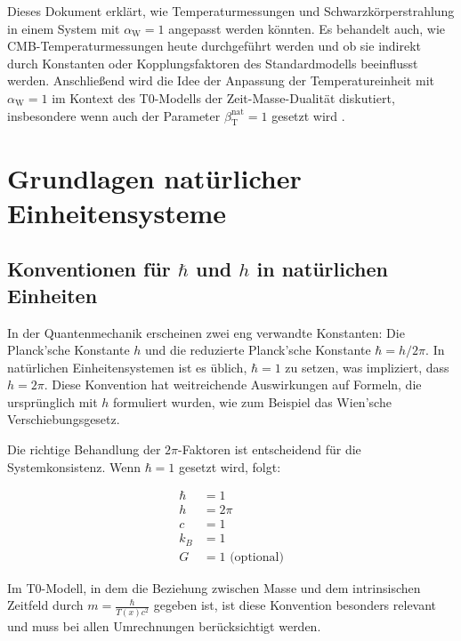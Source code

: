 \documentclass[12pt,a4paper]{article}
\newcommand{\Tfield}{T(x)}
\newcommand{\betaT}{\beta_{\text{T}}}
\newcommand{\alphaW}{\alpha_{\text{W}}}
\begin{document}
	Dieses Dokument erklärt, wie Temperaturmessungen und Schwarzkörperstrahlung in einem System mit \(\alphaW = 1\) angepasst werden könnten. Es behandelt auch, wie CMB-Temperaturmessungen heute durchgeführt werden und ob sie indirekt durch Konstanten oder Kopplungsfaktoren des Standardmodells beeinflusst werden. Anschließend wird die Idee der Anpassung der Temperatureinheit mit \(\alphaW = 1\) im Kontext des T0-Modells der Zeit-Masse-Dualität \cite{pascher_galaxies_2025} diskutiert, insbesondere wenn auch der Parameter \(\betaT^{\text{nat}} = 1\) gesetzt wird \cite{pascher_params_2025}.
	
	\section{Grundlagen natürlicher Einheitensysteme}
	\label{sec:foundations}
	
	\subsection{Konventionen für \(\hbar\) und \(h\) in natürlichen Einheiten}
	\label{subsec:conventions}
	
	In der Quantenmechanik erscheinen zwei eng verwandte Konstanten: Die Planck'sche Konstante \(h\) und die reduzierte Planck'sche Konstante \(\hbar = h/2\pi\). In natürlichen Einheitensystemen ist es üblich, \(\hbar = 1\) zu setzen, was impliziert, dass \(h = 2\pi\). Diese Konvention hat weitreichende Auswirkungen auf Formeln, die ursprünglich mit \(h\) formuliert wurden, wie zum Beispiel das Wien'sche Verschiebungsgesetz.
	
	Die richtige Behandlung der \(2\pi\)-Faktoren ist entscheidend für die Systemkonsistenz. Wenn \(\hbar = 1\) gesetzt wird, folgt:
	
	\begin{tcolorbox}[colback=blue!5!white,colframe=blue!75!black,title=Konventionen in natürlichen Einheiten]
		\begin{align}
			\hbar &= 1 \\
			h &= 2\pi \\
			c &= 1 \\
			k_B &= 1 \\
			G &= 1 \text{ (optional)}
		\end{align}
	\end{tcolorbox}
	
	Im T0-Modell, in dem die Beziehung zwischen Masse und dem intrinsischen Zeitfeld durch \(m = \frac{\hbar}{\Tfield c^2}\) \cite{pascher_galaxies_2025} gegeben ist, ist diese Konvention besonders relevant und muss bei allen Umrechnungen berücksichtigt werden.
	
\end{document}
